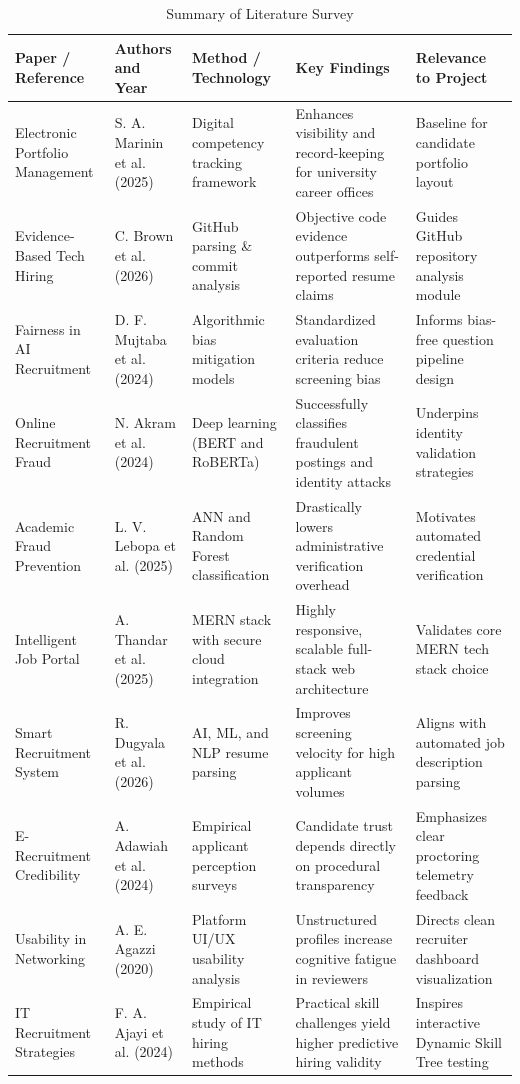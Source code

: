 \begin{table}[htbp]
\caption{Summary of Literature Survey}
\centering
\small
\begin{tabular}{|p{}|p{}|p{}|p{}|p{}|}
\hline
\textbf{Paper / Reference} & \textbf{Authors and Year} & \textbf{Method / Technology} & \textbf{Key Findings} & \textbf{Relevance to Project} \\
\hline
Electronic Portfolio Management \cite{Marinin2025} & S. A. Marinin et al. (2025) & Digital competency tracking framework & Enhances visibility and record-keeping for university career offices & Baseline for candidate portfolio layout \\
\hline
Evidence-Based Tech Hiring \cite{Brown2026} & C. Brown et al. (2026) & GitHub parsing \& commit analysis & Objective code evidence outperforms self-reported resume claims & Guides GitHub repository analysis module \\
\hline
Fairness in AI Recruitment \cite{Mujtaba2024} & D. F. Mujtaba et al. (2024) & Algorithmic bias mitigation models & Standardized evaluation criteria reduce screening bias & Informs bias-free question pipeline design \\
\hline
Online Recruitment Fraud \cite{Akram2024} & N. Akram et al. (2024) & Deep learning (BERT and RoBERTa) & Successfully classifies fraudulent postings and identity attacks & Underpins identity validation strategies \\
\hline
Academic Fraud Prevention \cite{Lebopa2025} & L. V. Lebopa et al. (2025) & ANN and Random Forest classification & Drastically lowers administrative verification overhead & Motivates automated credential verification \\
\hline
Intelligent Job Portal \cite{Thandar2025} & A. Thandar et al. (2025) & MERN stack with secure cloud integration & Highly responsive, scalable full-stack web architecture & Validates core MERN tech stack choice \\
\hline
Smart Recruitment System \cite{Dugyala2026} & R. Dugyala et al. (2026) & AI, ML, and NLP resume parsing & Improves screening velocity for high applicant volumes & Aligns with automated job description parsing \\
\hline
E-Recruitment Credibility \cite{Adawiah2024} & A. Adawiah et al. (2024) & Empirical applicant perception surveys & Candidate trust depends directly on procedural transparency & Emphasizes clear proctoring telemetry feedback \\
\hline
Usability in Networking \cite{Agazzi2020} & A. E. Agazzi (2020) & Platform UI/UX usability analysis & Unstructured profiles increase cognitive fatigue in reviewers & Directs clean recruiter dashboard visualization \\
\hline
IT Recruitment Strategies \cite{Ajayi2024} & F. A. Ajayi et al. (2024) & Empirical study of IT hiring methods & Practical skill challenges yield higher predictive hiring validity & Inspires interactive Dynamic Skill Tree testing \\
\hline
\end{tabular}
\end{table}

